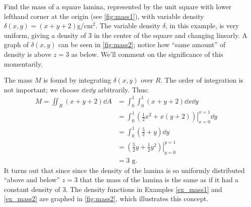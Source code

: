 \begin{example}\label{ex_mass2}
Find the mass of a square lamina, represented by the unit square with lower lefthand corner at the origin (see \autoref{fig:mass1}), with variable density $\delta(x,y) = (x+y+2)$g/cm$^2$.
\solution
The variable density $\delta$, in this example, is very uniform, giving a density of 3 in the center of the square and changing linearly. A graph of $\delta(x,y)$ can be seen in \autoref{fig:mass2}; notice how ``same amount'' of density is above $z=3$ as below. We'll comment on the significance of this momentarily.

The mass $M$ is found by integrating $\delta(x,y)$ over $R$. The order of integration is not important; we choose $\dd x\dd y$ arbitrarily. Thus:
\begin{align*}
M = \iint_R(x+y+2)\dd A &= \int_0^1\int_0^1 (x+y+2)\dd x\dd y\\
		&= \int_0^1\left.\left(\frac 12x^2+x(y+2)\right)\right|_{x=0}^{x=1}\dd y\\
		&= \int_0^1 \left(\frac52+y\right)\dd y\\
		&= \left.\left(\frac52y+\frac12y^2\right)\right|_{y=0}^{y=1}\\
		&= 3\text{ g}.
\end{align*}
It turns out that since since the density of the lamina is so uniformly distributed ``above and below'' $z=3$ that the mass of the lamina is the same as if it had a constant density of 3. The density functions in Examples \ref{ex_mass1} and \ref{ex_mass2} are graphed in \autoref{fig:mass2}, which illustrates this concept.
\end{example}

